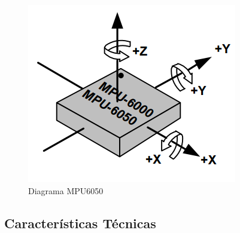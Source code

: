 \documentclass[12pt,a4paper]{article}
\begin{document}
\begin{figure}[H]
  \centering
  \includegraphics[scale=0.5]{images/MPU6050}
  \caption{Diagrama MPU6050}
  \label{fig:MPU6050}
\end{figure}

\subsection{Características Técnicas}
\end{document}

